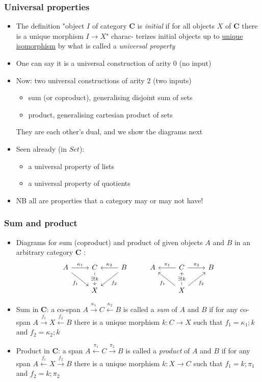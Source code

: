 \documentclass[handout]{beamer}
\newcommand{\bfsf}[1]{{\boldsymbol{#1}}}
\newcommand{\CC}{\bfsf{C}}
\begin{document}
\frame
  {   
    \frametitle{Universal properties}\label{Ch4:UnivProp}

 \begin{itemize}[<+->]
\item The definition "object $I$ of category $\CC$ is \emph{initial}  
if for all objects $X$ of $\CC$ there is a unique morphism $I\to X$" charac- terizes  
initial objects up to 
\href{https://en.wikipedia.org/wiki/Essentially\_unique}{\color{blue}unique isomorphism}
by what is called a \emph{universal property}
\item One can say it is a universal construction of arity  0 (no input)
\item Now: two universal constructions of arity 2 (two inputs)
\begin{itemize}
    \item sum (or coproduct), generalising disjoint sum of sets
    \item product, generalising cartesian product of sets
 \end{itemize}
They are each other's dual, and we show the diagrams next %
\item Seen already (in $Set$):
\begin{itemize}
    \item a universal property of lists
    \item a universal property of quotients
 \end{itemize}
\item NB all are properties that a category may or may not have!
\end{itemize}

 }

\frame
  {   
    \frametitle{Sum and product}\label{Ch4:SumProd}

 \begin{itemize}[<+->]
\item Diagrams for sum (coproduct) and product of given objects $A$ and $B$
in an arbitrary category $\CC$ :
\[
\begin{tikzcd}[ampersand replacement=\&]
A \arrow{r}{\kappa_1} \arrow[swap]{dr}{f_1}\&
C\arrow{d}[description]{\exists!k} \& 
B \arrow[swap]{l}{\kappa_2}\arrow{dl}{f_2} \&
A \&
C\arrow[swap]{l}{\pi_1} \arrow{r}{\pi_2}\&
B\\
\& X\&\& \&
X\arrow{ul}{f_1}\arrow{u}[description]{\exists!k} \arrow[swap]{ur}{f_2}
\end{tikzcd}
\]
\item Sum in $\CC$: a co-span $A\stackrel{\kappa_1}{\to} C \stackrel{\kappa_2}{\leftarrow}B$ 
is called a \emph{sum} of $A$ and $B$ 
if for any co-span 
$A\stackrel{f_1}{\to} X \stackrel{f_2}{\leftarrow}B$ 
there is a unique morphism $k: C\to X$
such that $f_1 = \kappa_1;k$ and $f_2 = \kappa_2;k$

\item Product in $\CC$: a span $A\stackrel{\pi_1}{\leftarrow} C \stackrel{\pi_2}{\to}B$ 
is called a \emph{product} of $A$ and $B$ if for any span 
$A\stackrel{f_1}{\leftarrow} X \stackrel{f_2}{\to}B$ 
there is a unique morphism $k: X\to C$
such that $f_1 = k;\pi_1$ and $f_2 = k;\pi_2$

 \end{itemize}

 }
\end{document}
